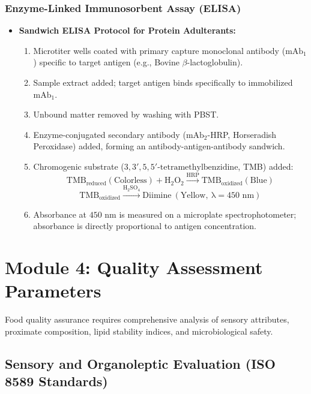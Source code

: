 \documentclass[11pt,a4paper,oneside]{article}
\begin{document}
\subsubsection{Enzyme-Linked Immunosorbent Assay (ELISA)}
\begin{itemize}[leftmargin=*]
    \item \textbf{Sandwich ELISA Protocol for Protein Adulterants:}
    \begin{enumerate}
        \item Microtiter wells coated with primary capture monoclonal antibody ($\mathrm{mAb_1}$) specific to target antigen (e.g., Bovine $\beta$-lactoglobulin).
        \item Sample extract added; target antigen binds specifically to immobilized $\mathrm{mAb_1}$.
        \item Unbound matter removed by washing with PBST.
        \item Enzyme-conjugated secondary antibody ($\mathrm{mAb_2}$-HRP, Horseradish Peroxidase) added, forming an antibody-antigen-antibody sandwich.
        \item Chromogenic substrate ($3,3',5,5'\text{-tetramethylbenzidine}$, TMB) added:
        $$\mathrm{TMB_{\text{reduced}} (Colorless) + H_2O_2 \xrightarrow{HRP} TMB_{\text{oxidized}} (Blue)}$$
        $$\mathrm{TMB_{\text{oxidized}} \xrightarrow{H_2SO_4} Diimine\ (Yellow,\ \lambda = 450\text{ nm})}$$
        \item Absorbance at $450\text{ nm}$ is measured on a microplate spectrophotometer; absorbance is directly proportional to antigen concentration.
    \end{enumerate}
\end{itemize}

\newpage

\section{Module 4: Quality Assessment Parameters}

Food quality assurance requires comprehensive analysis of sensory attributes, proximate composition, lipid stability indices, and microbiological safety.

\subsection{Sensory and Organoleptic Evaluation (ISO 8589 Standards)}
\end{document}
